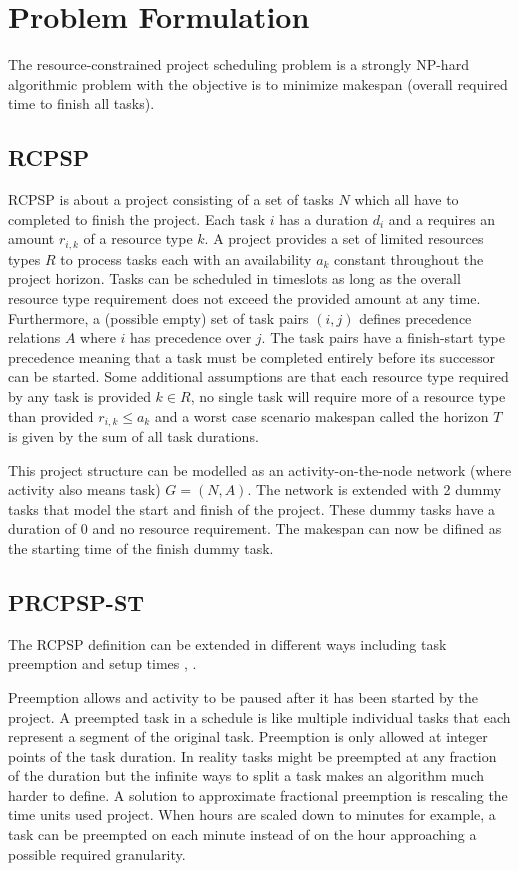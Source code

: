 \section{Problem Formulation}
The resource-constrained project scheduling problem is a strongly NP-hard algorithmic problem \cite{RN20} with the objective is to minimize makespan (overall required time to finish all tasks). 

\subsection{RCPSP}
RCPSP is about a project consisting of a set of tasks \(N\) which all have to completed to finish the project. Each task \(i\) has a duration \(d_i\) and a requires an amount \(r_{i,k}\) of a resource type \(k\). A project provides a set of limited resources types \(R\) to process tasks each with an availability \(a_k\) constant throughout the project horizon. Tasks can be scheduled in timeslots as long as the overall resource type requirement does not exceed the provided amount at any time. Furthermore, a (possible empty) set of task pairs \((i,j)\) defines precedence relations \(A\) where \(i\) has precedence over \(j\). The task pairs have a finish-start type precedence meaning that a task must be completed entirely before its successor can be started. Some additional assumptions are that each resource type required by any task is provided \(k\in R\), no single task will require more of a resource type than provided \(r_{i,k}\leq a_k\) and a worst case scenario makespan called the horizon \(T\) is given by the sum of all task durations.

This project structure can be modelled as an activity-on-the-node network (where activity also means task) \(G=(N,A)\). The network is extended with 2 dummy tasks that model the start and finish of the project. These dummy tasks have a duration of 0 and no resource requirement. The makespan can now be difined as the starting time of the finish dummy task.

\subsection{PRCPSP-ST}
The RCPSP definition can be extended in different ways including task preemption and setup times \cite{RN6}, \cite{RN27}.

Preemption allows and activity to be paused after it has been started by the project. A preempted task in a schedule is like multiple individual tasks that each represent a segment of the original task. Preemption is only allowed at integer points of the task duration. In reality tasks might be preempted at any fraction of the duration but the infinite ways to split a task makes an algorithm much harder to define. A solution to approximate fractional preemption is rescaling the time units used project. When hours are scaled down to minutes for example, a task can be preempted on each minute instead of on the hour approaching a possible required granularity.

